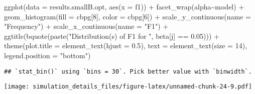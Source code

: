 \documentclass[
]{article}
\newenvironment{Shaded}{\begin{snugshade}}{\end{snugshade}}
\newcommand{\AttributeTok}[1]{\textcolor[rgb]{0.77,0.63,0.00}{#1}}
\newcommand{\DecValTok}[1]{\textcolor[rgb]{0.00,0.00,0.81}{#1}}
\newcommand{\FloatTok}[1]{\textcolor[rgb]{0.00,0.00,0.81}{#1}}
\newcommand{\FunctionTok}[1]{\textcolor[rgb]{0.00,0.00,0.00}{#1}}
\newcommand{\NormalTok}[1]{#1}
\newcommand{\SpecialCharTok}[1]{\textcolor[rgb]{0.00,0.00,0.00}{#1}}
\newcommand{\StringTok}[1]{\textcolor[rgb]{0.31,0.60,0.02}{#1}}
\begin{document}
\begin{Shaded}
\begin{Highlighting}[]
\FunctionTok{ggplot}\NormalTok{(}\AttributeTok{data =}\NormalTok{ results.smallB.opt,}
       \FunctionTok{aes}\NormalTok{(}\AttributeTok{x =}\NormalTok{ f1)) }\SpecialCharTok{+}
  \FunctionTok{facet\_wrap}\NormalTok{(alpha}\SpecialCharTok{\textasciitilde{}}\NormalTok{model) }\SpecialCharTok{+}
  \FunctionTok{geom\_histogram}\NormalTok{(}\AttributeTok{fill =}\NormalTok{ cbpg[}\DecValTok{8}\NormalTok{], }\AttributeTok{color =}\NormalTok{ cbpg[}\DecValTok{6}\NormalTok{]) }\SpecialCharTok{+}
  \FunctionTok{scale\_y\_continuous}\NormalTok{(}\AttributeTok{name =} \StringTok{"Frequency"}\NormalTok{) }\SpecialCharTok{+}
  \FunctionTok{scale\_x\_continuous}\NormalTok{(}\AttributeTok{name =} \StringTok{"F1"}\NormalTok{) }\SpecialCharTok{+}
  \FunctionTok{ggtitle}\NormalTok{(}\FunctionTok{bquote}\NormalTok{(}\FunctionTok{paste}\NormalTok{(}\StringTok{"Distribution(s) of F1 for "}\NormalTok{, beta[j] }\SpecialCharTok{==} \FloatTok{0.05}\NormalTok{))) }\SpecialCharTok{+}
  \FunctionTok{theme}\NormalTok{(}\AttributeTok{plot.title =} \FunctionTok{element\_text}\NormalTok{(}\AttributeTok{hjust =} \FloatTok{0.5}\NormalTok{), }
        \AttributeTok{text =} \FunctionTok{element\_text}\NormalTok{(}\AttributeTok{size =} \DecValTok{14}\NormalTok{),}
        \AttributeTok{legend.position =} \StringTok{"bottom"}\NormalTok{)}
\end{Highlighting}
\end{Shaded}

\begin{verbatim}
## `stat_bin()` using `bins = 30`. Pick better value with `binwidth`.
\end{verbatim}

\texttt{[image: simulation\_details\_files/figure-latex/unnamed-chunk-24-9.pdf]}
\end{document}
